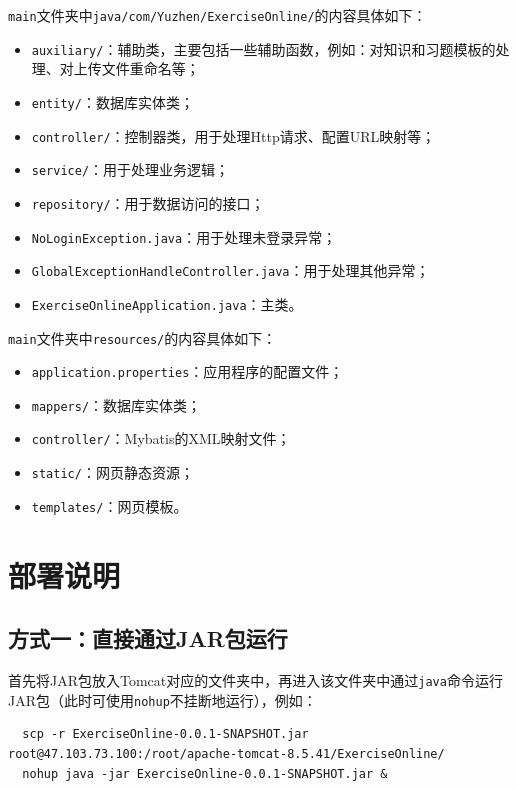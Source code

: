 \documentclass{nwafucoursepaper}
\begin{document}
\verb|main|文件夹中\verb|java/com/Yuzhen/ExerciseOnline/|的内容具体如下：
\begin{itemize}
    \item \verb|auxiliary/|：辅助类，主要包括一些辅助函数，例如：对知识和习题模板的处理、对上传文件重命名等；
    \item \verb|entity/|：数据库实体类；
    \item \verb|controller/|：控制器类，用于处理Http请求、配置URL映射等；
    \item \verb|service/|：用于处理业务逻辑；
    \item \verb|repository/|：用于数据访问的接口；
    \item \verb|NoLoginException.java|：用于处理未登录异常；
    \item \verb|GlobalExceptionHandleController.java|：用于处理其他异常；
    \item \verb|ExerciseOnlineApplication.java|：主类。
\end{itemize}

\verb|main|文件夹中\verb|resources/|的内容具体如下：
\begin{itemize}
    \item \verb|application.properties|：应用程序的配置文件；
    \item \verb|mappers/|：数据库实体类；
    \item \verb|controller/|：Mybatis的XML映射文件；
    \item \verb|static/|：网页静态资源；
    \item \verb|templates/|：网页模板。
\end{itemize}

\section{部署说明}

\subsection{方式一：直接通过JAR包运行}

首先将JAR包放入Tomcat对应的文件夹中，再进入该文件夹中通过\verb|java|命令运行JAR包（此时可使用\verb|nohup|不挂断地运行），例如：
\begin{lstlisting}
  scp -r ExerciseOnline-0.0.1-SNAPSHOT.jar root@47.103.73.100:/root/apache-tomcat-8.5.41/ExerciseOnline/
  nohup java -jar ExerciseOnline-0.0.1-SNAPSHOT.jar &
\end{lstlisting}
\end{document}
